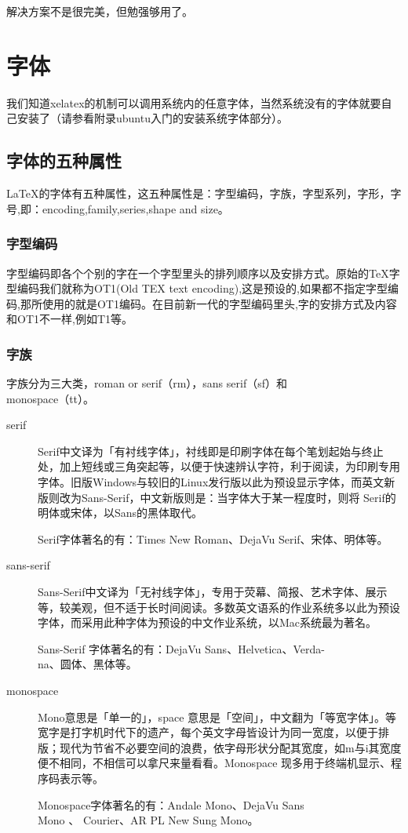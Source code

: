 \documentclass[11pt,oneside]{book}
\begin{document}
解决方案不是很完美，但勉强够用了。





\chapter{字体}
我们知道xelatex的机制可以调用系统内的任意字体，当然系统没有的字体就要自己安装了（请参看附录ubuntu入门的安装系统字体部分）。

\section{字体的五种属性}
\LaTeX 的字体有五种属性，这五种属性是：字型编码，字族，字型系列，字形，字号,即：encoding,family,series,shape and size。

\subsection{字型编码}
字型编码即各个个别的字在一个字型里头的排列顺序以及安排方式。原始的\TeX 字型编码我们就称为OT1(Old TEX text encoding),这是预设的,如果都不指定字型编码,那所使用的就是OT1编码。在目前新一代的字型编码里头,字的安排方式及内容和OT1不一样,例如T1等。


\subsection{字族}
字族分为三大类，roman or serif（rm），sans serif（sf）和\\monospace（tt）。


\begin{description}
\item[serif] Serif中文译为「有衬线字体」，衬线即是印刷字体在每个笔划起始与终止处，加上短线或三角突起等，以便于快速辨认字符，利于阅读，为印刷专用字体。旧版Windows与较旧的Linux发行版以此为预设显示字体，而英文新版则改为Sans-Serif，中文新版则是：当字体大于某一程度时，则将 Serif的明体或宋体，以Sans的黑体取代。

Serif字体著名的有：Times New Roman、DejaVu Serif、宋体、明体等。

\item[sans-serif] Sans-Serif中文译为「无衬线字体」，专用于荧幕、简报、艺术字体、展示等，较美观，但不适于长时间阅读。多数英文语系的作业系统多以此为预设字体，而采用此种字体为预设的中文作业系统，以Mac系统最为著名。

Sans-Serif 字体著名的有：DejaVu Sans、Helvetica、Verda-\\na、圆体、黑体等。

\item[monospace] Mono意思是「单一的」，space 意思是「空间」，中文翻为「等宽字体」。等宽字是打字机时代下的遗产，每个英文字母皆设计为同一宽度，以便于排版；现代为节省不必要空间的浪费，依字母形状分配其宽度，如m与i其宽度便不相同，不相信可以拿尺来量看看。Monospace 现多用于终端机显示、程序码表示等。

Monospace字体著名的有：Andale Mono、DejaVu Sans \\ Mono 、 Courier、AR PL New Sung Mono。
\end{description}
\end{document}
